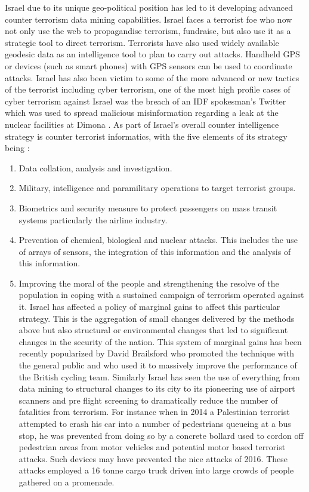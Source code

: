 Israel due to its unique geo-political position has led to it developing advanced counter terrorism data mining capabilities. Israel faces a terrorist foe who now not only use the web to propagandise terrorism, fundraise, but also use it as a strategic tool to direct terrorism. Terrorists have also used widely available geodesic data as an intelligence tool to plan to carry out attacks. Handheld GPS or devices (such as smart phones) with GPS sensors can be used to coordinate attacks. Israel has also been victim to some of the more advanced or new tactics of the terrorist including cyber terrorism, one of the most high profile cases of cyber terrorism against Israel was the breach of an IDF  spokesman's Twitter which was used to spread  malicious misinformation regarding a leak at the nuclear facilities at Dimona \citep{Israeltwitterhack}.
As part of Israel's overall counter intelligence strategy is counter terrorist informatics, with the five elements of its strategy being \citep{tucker2003strategies}:
\begin{enumerate}
	\item Data collation, analysis and investigation.
	\item Military, intelligence and paramilitary operations to target terrorist groups.
	\item Biometrics and security measure to protect passengers on mass transit systems particularly the airline industry.
	\item Prevention of chemical, biological and nuclear attacks. This includes the use of arrays of sensors, the integration of this information and the analysis of this information.
	\item Improving the moral of the people and strengthening the resolve of the population in coping with a sustained campaign of terrorism operated against it. Israel has affected a policy of marginal gains to affect this particular strategy. This is the aggregation of small changes delivered by the methods above but also structural or environmental changes that led to significant changes in the security of the nation. This system of marginal gains has been recently popularized by David Brailsford who promoted the technique with the general public \citep{durrand2014pre} and who used it to massively improve the performance of the British cycling team. Similarly Israel has seen the use of everything from data mining to structural changes to its city to its pioneering use of airport scanners and pre flight screening to dramatically reduce the number of fatalities from terrorism. For instance when in 2014 a Palestinian terrorist attempted to crash his car into a number of pedestrians queueing at a bus stop, he was prevented from doing so by a concrete bollard \citep{Israelcounterterrorismlesson}  used to cordon off pedestrian areas from motor vehicles and potential motor based terrorist attacks. Such devices may have prevented the nice attacks of 2016. These attacks employed a 16 tonne cargo truck driven into large crowds of people gathered on a promenade\citep{nesser2016jihadi}. 
\end{enumerate}

